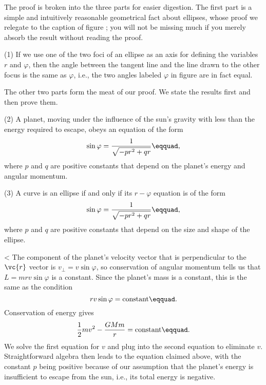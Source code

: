The proof is broken into the three parts for easier
digestion. The first part is a simple and intuitively
reasonable geometrical fact about ellipses, whose proof we
relegate to the caption of figure ; you will not be missing
much if you merely absorb the result without reading the proof.

(1) If we use one of the two foci of an ellipse as an axis
for defining the variables $r$ and $\varphi $, then the angle
between the tangent line and the line drawn to the other
focus is the same as $\varphi $, i.e., the two angles labeled
$\varphi $ in figure  are in fact equal.

The other two parts form the meat of our proof. We state the
results first and then prove them.

(2) A planet, moving under the influence of the sun's
gravity with less than the energy required to escape, obeys
an equation of the form
\begin{equation*}
 \sin\varphi = \frac{1}{\sqrt{-pr^2+qr}}\eqquad,
\end{equation*}
 where $p$ and $q$  are positive constants that depend on the planet's
 energy and angular momentum.

(3) A curve is an ellipse if and only if its $r-\varphi $
equation is of the form
\begin{equation*}
 \sin\varphi = \frac{1}{\sqrt{-pr^2+qr}}\eqquad,
\end{equation*}
where $p$ and $q$ are positive constants that depend on the size and
shape of the ellipse.

<%
The component of the planet's velocity vector that is
perpendicular to the $\vc{r}$ vector is $v_\perp=v \sin \varphi $, so
conservation of angular momentum tells us that $L=mrv \sin\varphi$
is a constant. Since the planet's
mass is a constant, this is the same as the condition
\begin{equation*}
                rv \sin  \varphi  =  \text{constant}\eqquad.
\end{equation*}
Conservation of energy gives
\begin{equation*}
                \frac{1}{2}mv^2-\frac{GMm}{r}          =  \text{constant}\eqquad.
\end{equation*}
We solve the first equation for $v$ and plug into the second
equation to eliminate $v$. Straightforward algebra then
leads to the equation claimed above, with the constant $p$
being positive because of our assumption that the planet's
energy is insufficient to escape from the sun, i.e., its
total energy is negative.

